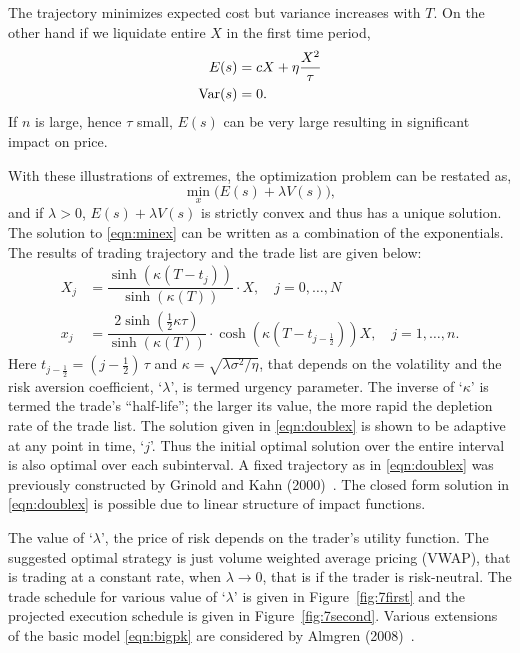 The trajectory minimizes expected cost but variance increases with $T$. On the other hand if we liquidate entire $X$ in the first time period,
	\begin{equation}\label{eqn:anotherdoubleex}
	\begin{split}
	E(s)&= c X + \eta \frac{X^2}{\tau} \\
	\var(s)&= 0.
	\end{split}
	\end{equation}
If $n$ is large, hence $\tau$ small, $E(s)$ can be very large resulting in significant impact on price.


 With these illustrations of extremes, the optimization problem can be restated as,
	\begin{equation}\label{eqn:minex}
	\min_x\big( E(s) + \lambda V(s) \big),
	\end{equation}
and if $\lambda>0$, $E(s)+\lambda V(s)$ is strictly convex and thus has a unique solution. The solution to \eqref{eqn:minex} can be written as a combination of the exponentials. The results of trading trajectory and the trade list are given below:
	\begin{equation}\label{eqn:doublex}
	\begin{split}
	X_j &= \dfrac{\sinh (\kappa(T-t_j))}{\sinh (\kappa(T))}\cdot X, \quad j=0,\ldots,N \\
	x_j &= \dfrac{2 \sinh (\frac{1}{2}\kappa\tau)}{\sinh (\kappa(T))}\cdot \cosh(\kappa(T-t_{j-\frac{1}{2}}))X, \quad j=1,\ldots, n.
	\end{split}
	\end{equation}
Here $t_{j - \frac{1}{2}} = (j - \frac{1}{2})\, \tau$ and $\kappa = \sqrt{\lambda \sigma^2 / \eta}$, that depends on the volatility and the risk aversion coefficient, `$\lambda$', is termed urgency parameter. The inverse of `$\kappa$' is termed the trade's ``half-life''; the larger its value, the more rapid the depletion rate of the trade list. The solution given in \eqref{eqn:doublex} is shown to be adaptive at any point in time, `$j$'. Thus the initial optimal solution over the entire interval is also optimal over each subinterval. A fixed trajectory as in \eqref{eqn:doublex} was previously constructed by Grinold and Kahn (2000)~\cite{grin2000}. The closed form solution in \eqref{eqn:doublex} is possible due to linear structure of impact functions. 


The value of `$\lambda$', the price of risk depends on the trader's utility function. The suggested optimal strategy is just volume weighted average pricing (VWAP), that is trading at a constant rate, when $\lambda \to 0$, that is if the trader is risk-neutral. The trade schedule for various value of `$\lambda$' is given in Figure~\ref{fig:7first} and the projected execution schedule is given in Figure~\ref{fig:7second}. Various extensions of the basic model \eqref{eqn:bigpk} are considered by Almgren (2008)~\cite{alm2008}.
	
